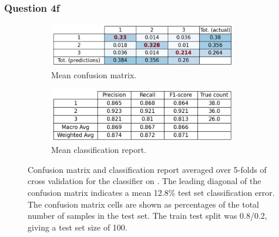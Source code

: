 \subsubsection{Question 4f}\label{subsubsec:qf}
    \begin{figure}[htb]
    \centering
    \begin{subfigure}{0.5\textwidth}
        \centering
        \includegraphics[width=0.9\textwidth]{./figures/q4f_confusion_matrix_all_feats}
        \caption{Mean confusion matrix.}
        \label{fig:q4f_confusion_matrix_all_feats}
    \end{subfigure}%
    \begin{subfigure}{0.5\textwidth}
        \centering
        \includegraphics[width=0.9\textwidth]{./figures/q4f_classification_report_all_feats}
        \caption{Mean classification report.}
        \label{fig:q4f_classification_report_all_feats}
    \end{subfigure}
    \caption{Confusion matrix and classification report averaged over 5-folds of cross validation for the
         classifier on .
        The leading diagonal of the confusion matrix indicates a mean 12.8\% test set classification error.
        The confusion matrix cells are shown as percentages of the total number of samples in the test set.
        The train test split was 0.8/0.2, giving a test set size of 100.}
    \label{fig:q4f_all_feats}
    \end{figure}

